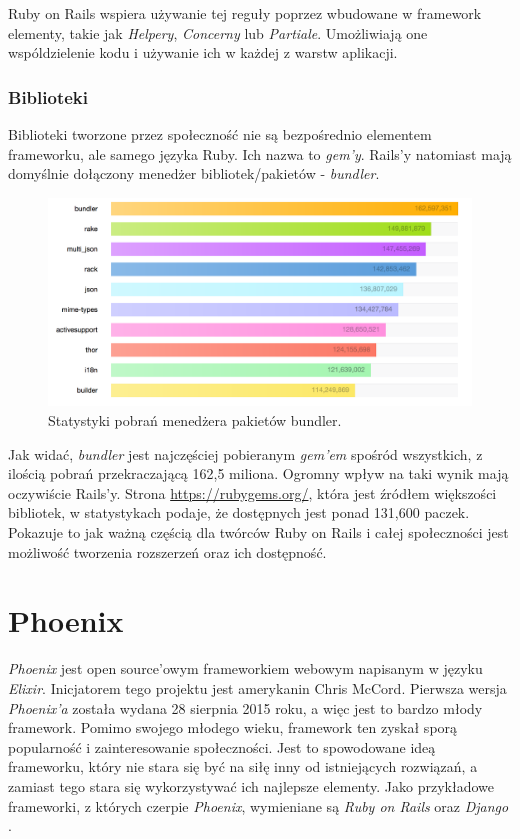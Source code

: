 Ruby on Rails wspiera używanie tej reguły poprzez wbudowane w framework elementy, takie jak \textit{Helpery}, \textit{Concerny} lub \textit{Partiale}. Umożliwiają one wspóldzielenie kodu i używanie ich w każdej z warstw aplikacji.

\subsubsection{Biblioteki}
Biblioteki tworzone przez społeczność nie są bezpośrednio elementem frameworku, ale samego języka Ruby. Ich nazwa to \textit{gem'y}. Rails'y natomiast mają domyślnie dołączony menedżer bibliotek/pakietów - \textit{bundler}.

\begin{figure}[h]
  \centering
  \includegraphics[width=\linewidth]{images/bundler_stats}
  \caption{Statystyki pobrań menedżera pakietów bundler.}
  \label{fig:bundler_stats}
\end{figure}

Jak widać, \textit{bundler} jest najczęściej pobieranym \textit{gem'em} spośród wszystkich, z ilością pobrań przekraczającą 162,5 miliona. Ogromny wpływ na taki wynik mają oczywiście Rails'y. Strona \url{https://rubygems.org/}, która jest źródłem większości bibliotek, w statystykach podaje, że dostępnych jest ponad 131,600 paczek. Pokazuje to jak ważną częścią dla twórców Ruby on Rails i całej społeczności jest możliwość tworzenia rozszerzeń oraz ich dostępność.

\section{Phoenix} %

\textit{Phoenix} jest open source'owym frameworkiem webowym napisanym w języku \textit{Elixir}. Inicjatorem tego projektu jest amerykanin Chris McCord. Pierwsza wersja \textit{Phoenix'a} została wydana 28 sierpnia 2015 roku, a więc jest to bardzo młody framework. Pomimo swojego młodego wieku, framework ten zyskał sporą popularność i zainteresowanie społeczności. Jest to spowodowane ideą frameworku, który nie stara się być na siłę inny od istniejących rozwiązań, a zamiast tego stara się wykorzystywać ich najlepsze elementy. Jako przykładowe frameworki, z których czerpie \textit{Phoenix}, wymieniane są \textit{Ruby on Rails} oraz \textit{Django} \cite{phoenix_docs}.

